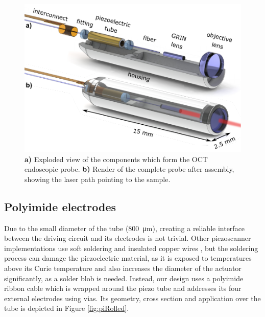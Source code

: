 \documentclass[10pt]{iopart}
\begin{document}
\begin{figure}[h!]\centering \includegraphics[width=\columnwidth]{figures/explodedRenderNames.pdf}
      \caption{\textbf{a)} Exploded view of the components which form the OCT endoscopic probe.
      \textbf{b)} Render of the complete probe after assembly, showing the laser path pointing to the sample.}
      \label{fig:exploded}
\end{figure}

\subsection{Polyimide electrodes}
Due to the small diameter of the tube (\SI{800}{\micro\meter}), creating a reliable interface between the driving circuit and its electrodes is not trivial. Other piezoscanner implementations use soft soldering and insulated copper wires \cite{Lee2010, Meinert, Huo2010}, but the soldering process can damage the piezoelectric material, as it is exposed to temperatures above its Curie temperature and also increases the diameter of the actuator significantly, as a solder blob is needed. Instead, our design uses a polyimide ribbon cable which is wrapped around the piezo tube and addresses its four external electrodes using vias. Its geometry, cross section and application over the tube is depicted in Figure \ref{fig:piRolled}.
\end{document}
